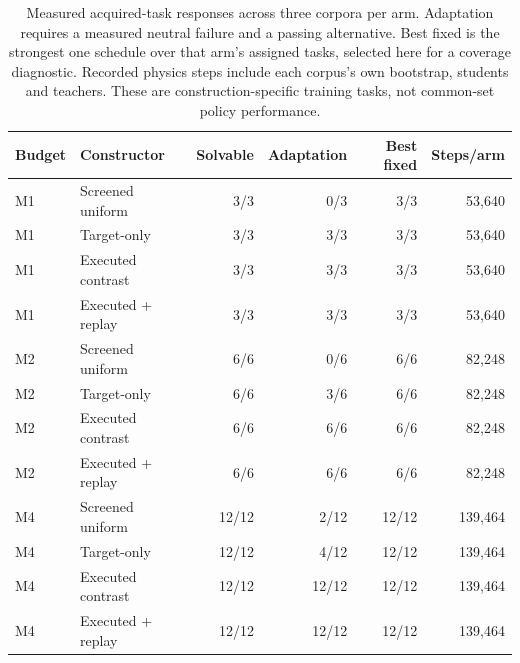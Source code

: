 \begin{table}[t]
\centering\small
\begin{tabular}{llrrrr}
\toprule
Budget & Constructor & Solvable & Adaptation & Best fixed & Steps/arm \\
\midrule
M1 & Screened uniform & 3/3 & 0/3 & 3/3 & 53,640 \\
M1 & Target-only & 3/3 & 3/3 & 3/3 & 53,640 \\
M1 & Executed contrast & 3/3 & 3/3 & 3/3 & 53,640 \\
M1 & Executed + replay & 3/3 & 3/3 & 3/3 & 53,640 \\
M2 & Screened uniform & 6/6 & 0/6 & 6/6 & 82,248 \\
M2 & Target-only & 6/6 & 3/6 & 6/6 & 82,248 \\
M2 & Executed contrast & 6/6 & 6/6 & 6/6 & 82,248 \\
M2 & Executed + replay & 6/6 & 6/6 & 6/6 & 82,248 \\
M4 & Screened uniform & 12/12 & 2/12 & 12/12 & 139,464 \\
M4 & Target-only & 12/12 & 4/12 & 12/12 & 139,464 \\
M4 & Executed contrast & 12/12 & 12/12 & 12/12 & 139,464 \\
M4 & Executed + replay & 12/12 & 12/12 & 12/12 & 139,464 \\
\bottomrule
\end{tabular}
\caption{Measured acquired-task responses across three corpora per arm. Adaptation requires a measured neutral failure and a passing alternative. Best fixed is the strongest one schedule over that arm's assigned tasks, selected here for a coverage diagnostic. Recorded physics steps include each corpus's own bootstrap, students and teachers. These are construction-specific training tasks, not common-set policy performance.}
\label{tab:acquisitionyield}
\end{table}
